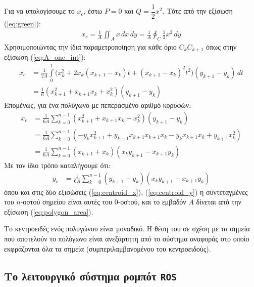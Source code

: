 Για να υπολογίσουμε το $x_c$, έστω $P = 0$ και $Q = \dfrac{1}{2}x^2$. Tότε από
την εξίσωση (\ref{eq:green}):
\begin{align}
  x_c = \frac{1}{A} \iint_A x \,dx \,dy = \frac{1}{A}\oint_C \frac{1}{2} x^2 \,dy
\end{align}
Χρησιμοποιώντας την ίδια παραμετροποίηση για κάθε όριο $C_k C_{k+1}$ όπως στην εξίσωση
(\ref{eq:A_one_int}):
\begin{align}
  x_c &= \frac{1}{2A} \int\limits_0^1 \big( x_k^2 + 2x_k (x_{k+1} - x_k)t + (x_{k+1} - x_k)^2 t^2 \big) (y_{k+1}- y_k) \,dt \nonumber \\
      &= \frac{1}{6}(x_{k+1}^2 + x_{k+1} x_k + x_k^2)(y_{k+1} - y_k) \nonumber
\end{align}
Επομένως, για ένα πολύγωνο με πεπερασμένο αριθμό κορυφών:
\begin{align}
  x_c &= \frac{1}{6A} \sum\limits_{k=0}^{n-1} (x_{k+1}^2 + x_{k+1} x_k + x_k^2)(y_{k+1} - y_k) \nonumber \\
      & = \frac{1}{6A} \sum\limits_{k=0}^{n-1} (-y_k x_{k+1}^2 + y_{k+1} x_{k+1} x_{k+1} x_k - y_k x_{k+1} x_k + y_{k+1} x_k^2) \nonumber \\
      &= \frac{1}{6A} \sum\limits_{k=0}^{n-1} (x_{k+1} + x_k) (x_k y_{k+1} - x_{k+1} y_k)
\label{eq:centroid_x}
\end{align}
Με τον ίδιο τρόπο καταλήγουμε ότι:
\begin{align}
  y_c &= \frac{1}{6A} \sum\limits_{k=0}^{n-1} (y_{k+1} + y_k) (x_k y_{k+1} - x_{k+1} y_k)
\label{eq:centroid_y}
\end{align}
όπου και στις δύο εξισώσεις (\ref{eq:centroid_x}), (\ref{eq:centroid_y}) η
συντεταγμένες του $n$-οστού σημείου είναι αυτές του $0$-οστού, και το εμβαδόν
$A$ δίνεται από την εξίσωση (\ref{eq:polygon_area}).

\begin{gg_box}
\begin{remark}
  \label{remark:centroid_uniqueness}
  Το κεντροειδές ενός πολυγώνου είναι μοναδικό. Η θέση του σε σχέση με τα
  σημεία που αποτελούν το πολύγωνο είναι ανεξάρτητη από το σύστημα αναφοράς στο
  οποίο εκφράζονται όλα τα σημεία (συμπεριλαμβανομένου του κεντροειδούς).
\end{remark}
\end{gg_box}


\subsection{Το λειτουργικό σύστημα ρομπότ \texttt{ROS}}
\label{subsec:01_01_02_9}


